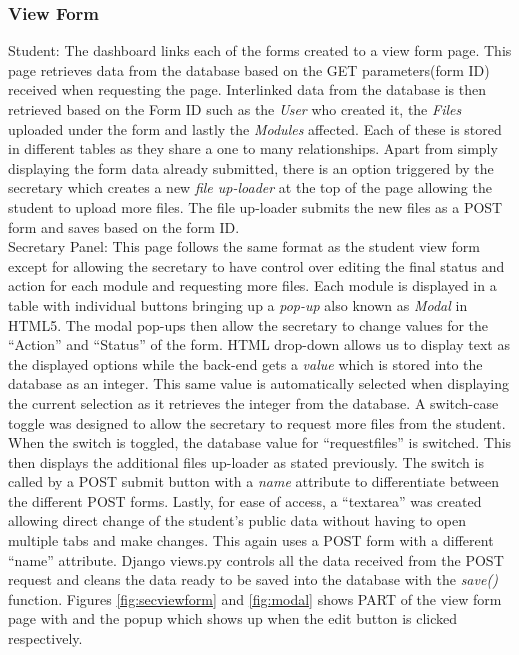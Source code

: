 \documentclass[../main.tex]{subfiles}
\begin{document}
\subsubsection{View Form} 

Student: The dashboard links each of the forms created to a view form page. This page retrieves data from the database based on the GET parameters(form ID) received when requesting the page. Interlinked data from the database is then retrieved based on the Form ID such as the \textit{User} who created it, the \textit{Files} uploaded under the form and lastly the \textit{Modules} affected. Each of these is stored in different tables as they share a one to many relationships. Apart from simply displaying the form data already submitted, there is an option triggered by the secretary which creates a new \textit{file up-loader} at the top of the page allowing the student to upload more files. The file up-loader submits the new files as a POST form and saves based on the form ID. \\[4mm]

Secretary Panel: This page follows the same format as the student view form except for allowing the secretary to have control over editing the final status and action for each module and requesting more files. Each module is displayed in a table with individual buttons bringing up a \textit{pop-up} also known as \textit{Modal} in HTML5. The modal pop-ups then allow the secretary to change values for the \enquote{Action} and \enquote{Status} of the form. HTML drop-down allows us to display text as the displayed options while the back-end gets a \textit{value} which is stored into the database as an integer. This same value is automatically selected when displaying the current selection as it retrieves the integer from the database. A switch-case toggle was designed to allow the secretary to request more files from the student. When the switch is toggled, the database value for \enquote{requestfiles} is switched. This then displays the additional files up-loader as stated previously. The switch is called by a POST submit button with a \textit{name} attribute to differentiate between the different POST forms. Lastly, for ease of access, a \enquote{textarea} was created allowing direct change of the student's public data without having to open multiple tabs and make changes. This again uses a POST form with a different \enquote{name} attribute. Django views.py controls all the data received from the POST request and cleans the data ready to be saved into the database with the \textit{save()} function. Figures \ref{fig:secviewform} and \ref{fig:modal} shows PART of the view form page with and the popup which shows up when the edit button is clicked respectively.\\[4mm]
\end{document}
